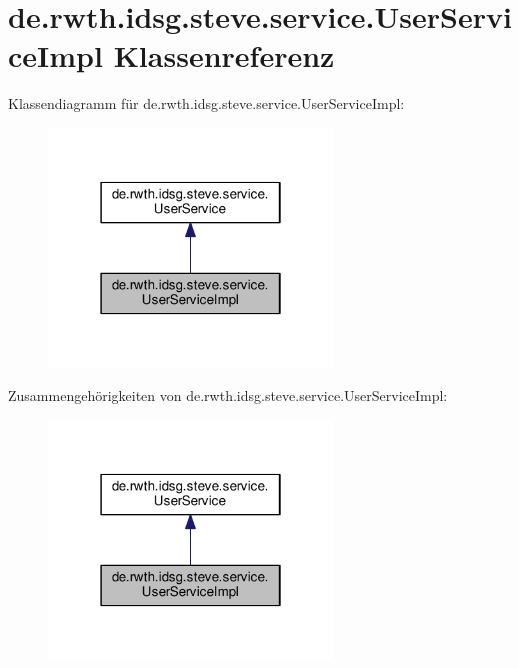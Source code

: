 \hypertarget{classde_1_1rwth_1_1idsg_1_1steve_1_1service_1_1_user_service_impl}{\section{de.\-rwth.\-idsg.\-steve.\-service.\-User\-Service\-Impl Klassenreferenz}
\label{classde_1_1rwth_1_1idsg_1_1steve_1_1service_1_1_user_service_impl}
}


Klassendiagramm für de.\-rwth.\-idsg.\-steve.\-service.\-User\-Service\-Impl\-:
\nopagebreak
\begin{figure}[H]
\begin{center}
\leavevmode
\includegraphics[width=214pt]{classde_1_1rwth_1_1idsg_1_1steve_1_1service_1_1_user_service_impl__inherit__graph}
\end{center}
\end{figure}


Zusammengehörigkeiten von de.\-rwth.\-idsg.\-steve.\-service.\-User\-Service\-Impl\-:
\nopagebreak
\begin{figure}[H]
\begin{center}
\leavevmode
\includegraphics[width=214pt]{classde_1_1rwth_1_1idsg_1_1steve_1_1service_1_1_user_service_impl__coll__graph}
\end{center}
\end{figure}
